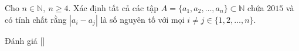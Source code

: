 \ifshowproblem
\begin{problem}\label{problem:ROU-2015-JBMO-TST-D4-P1}
    Cho \( n \in \mathbb{N},\ n \geq 4 \). Xác định tất cả các tập \( A = \{a_1, a_2, \ldots, a_n\} \subset \mathbb{N} \) chứa \(2015\)
    và có tính chất rằng \( |a_i - a_j| \) là số nguyên tố với mọi \( i \ne j \in \{1, 2, \ldots, n\} \).
\end{problem}
\fi

\ifshowinfo
Đánh giá [\textbf{}]\footnotemark
{}
\fi